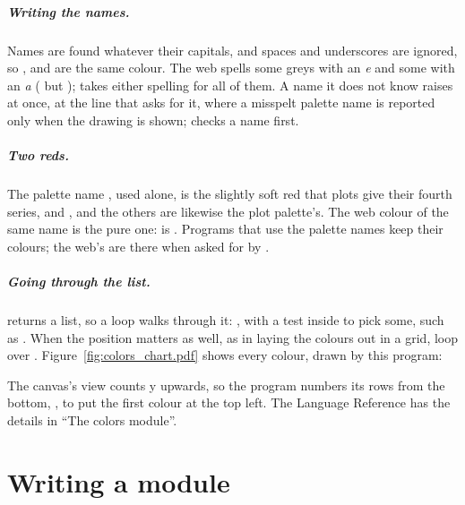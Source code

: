 \documentclass[11pt,a4paper,openany]{report}
\begin{document}
{{\paragraph{Writing the names.} Names are found whatever their capitals, and
spaces and underscores are ignored, so ,
 and  are the same colour. The web spells
some greys with an \emph{e} and some with an \emph{a} ( but
);  takes either spelling for all of them. A name
it does not know raises  at once, at the line that asks
for it, where a misspelt palette name is reported only when the drawing is
shown;  checks a name first.

\paragraph{Two reds.} The palette name , used alone, is the
slightly soft red that plots give their fourth series, and ,
 and the others are likewise the plot palette's. The web colour
of the same name is the pure one:  is
\code{[1.0, 0.0, 0.0]}. Programs that use the palette names keep their
colours; the web's are there when asked for by .

\paragraph{Going through the list.}  returns a list, so a
 loop walks through it: , with a
test inside to pick some, such as . When the
position matters as well, as in laying the colours out in a grid, loop over
. Figure~\ref{fig:colors_chart.pdf} shows every colour,
drawn by this program:



The canvas's view counts y upwards, so the program numbers its rows from the
bottom, , to put the first colour at the top
left. The Language Reference has the details in ``The colors module''.

\chapter{Writing a module}\label{ch:module}

}}
\end{document}
